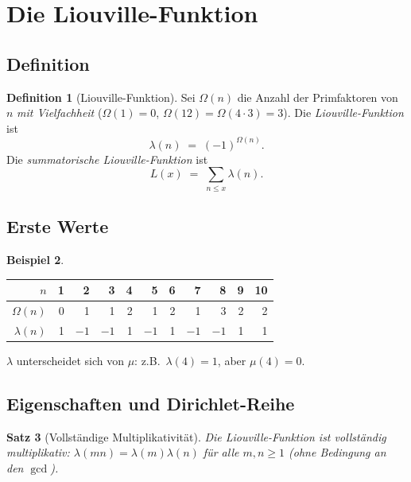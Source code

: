 \documentclass[12pt,a4paper]{amsart}
\newtheorem{theorem}{Satz}[section]
\theoremstyle{definition}
\newtheorem{definition}[theorem]{Definition}
\newtheorem{beispiel}[theorem]{Beispiel}
\begin{document}
\section{Die Liouville-Funktion}
\label{sec:liouville}

\subsection{Definition}

\begin{definition}[Liouville-Funktion]
\label{def:liouville}
Sei $\Omega(n)$ die Anzahl der Primfaktoren von $n$ \emph{mit Vielfachheit}
($\Omega(1)=0$, $\Omega(12)=\Omega(4\cdot 3)=3$).  Die
\emph{Liouville-Funktion} ist
\[
  \lambda(n) \;=\; (-1)^{\Omega(n)}.
\]
Die \emph{summatorische Liouville-Funktion} ist
\[
  L(x) \;=\; \sum_{n \le x} \lambda(n).
\]
\end{definition}

\subsection{Erste Werte}

\begin{beispiel}
\label{bsp:liouville-werte}
\begin{center}
\begin{tabular}{r|rrrrrrrrrr}
$n$          & 1 & 2 & 3 & 4 & 5 & 6 & 7 & 8 & 9 & 10 \\
\hline
$\Omega(n)$  & 0 & 1 & 1 & 2 & 1 & 2 & 1 & 3 & 2 & 2 \\
$\lambda(n)$ & 1 &$-1$&$-1$& 1 &$-1$& 1 &$-1$&$-1$& 1 & 1
\end{tabular}
\end{center}
$\lambda$ unterscheidet sich von $\mu$: z.B.\ $\lambda(4)=1$, aber $\mu(4)=0$.
\end{beispiel}

\subsection{Eigenschaften und Dirichlet-Reihe}

\begin{theorem}[Vollständige Multiplikativität]
\label{satz:liouville-mult}
Die Liouville-Funktion ist \emph{vollständig multiplikativ}:
$\lambda(mn) = \lambda(m)\lambda(n)$ für \emph{alle} $m,n \ge 1$
(ohne Bedingung an den $\gcd$).
\end{theorem}
\end{document}
